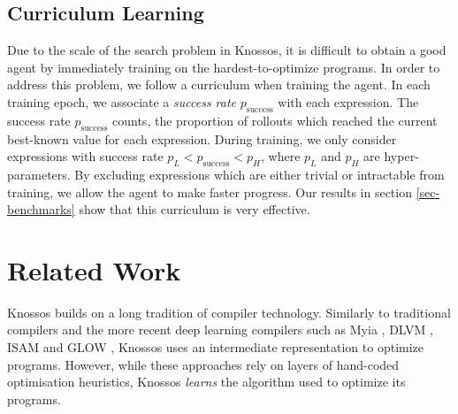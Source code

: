 \documentclass[fullpage,twocolumn]{article} %
\newcommand{\SuccessRate}{p_\text{success}}
\begin{document}
\subsection{Curriculum Learning}
 \label{sec-curriculum}
Due to the scale of the search problem in Knossos, it is difficult to obtain a good agent by immediately training on the hardest-to-optimize programs. In order to address this problem, we follow a curriculum \citep{elman1993learning, bengio2009curriculum} when training the agent. In each training epoch, we associate a \emph{success rate} $\SuccessRate$ with each expression. The success rate $\SuccessRate$ counts, the proportion of rollouts which reached the current best-known value for each expression. During training, we only consider expressions with success rate $p_L < \SuccessRate < p_H$, where $p_L$ and $p_H$ are hyper-parameters. By excluding expressions which are either trivial or intractable from training, we allow the agent to make faster progress. Our results in section \ref{sec-benchmarks} show that this curriculum is very effective. 
% 



\section{Related Work}
\label{sec-related-work}
Knossos builds on a long tradition of compiler technology. Similarly to traditional compilers \citep{santosProgramTransformationGlasgow1992, lattnerLLVMCompilationFramework2004} and the more recent deep learning compilers such as  Myia \citep{merrienboerAutomaticDifferentiationML2018}, DLVM \citep{weiDLVMModernCompiler2018},  ISAM \citep{sotoudehISAMapperCompute2019} and GLOW \citep{rotemGlowGraphLowering2018}, Knossos uses an intermediate representation to optimize programs. However, while these approaches rely on layers of hand-coded optimisation heuristics, Knossos \emph{learns} the algorithm used to optimize its programs.
\end{document}
